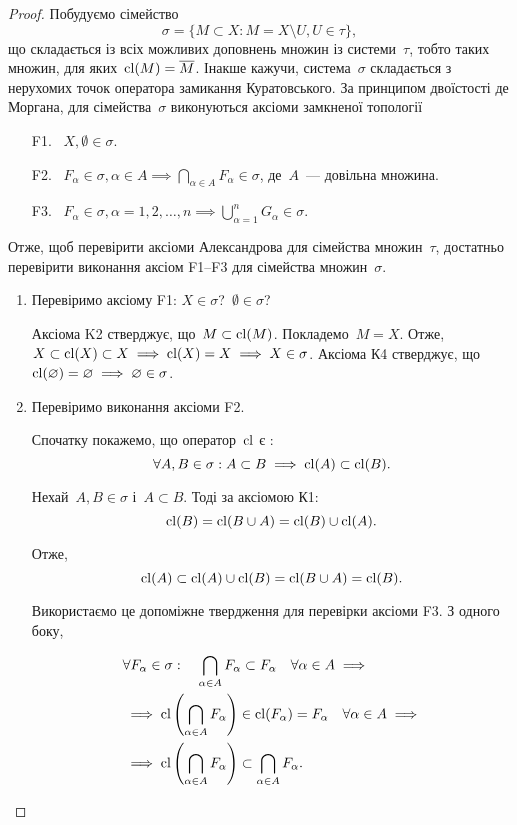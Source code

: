 \begin{proof}
Побудуємо сімейство \[\sigma = \{ M \subset X: M = X \setminus U, U \in \tau\}, \]
що складається із всіх можливих доповнень множин із
системи~$\tau$, тобто таких множин, для яких~$\operatorname{cl}(M) = \overline{M}$. Інакше
кажучи, система~$\sigma$ складається з нерухомих точок оператора
замикання Куратовського. За принципом двоїстості де
Моргана, для сімейства~$\sigma$ виконуються аксіоми замкненої
топології

\begin{enumerate}
\item[F1.]~$X, \emptyset \in \sigma$.
\item[F2.]~$F_\alpha \in \sigma, \alpha \in A \implies \bigcap_{\alpha \in A} F_\alpha \in \sigma$, де~$A$~--- довільна множина.
\item[F3.]~$F_\alpha \in \sigma, \alpha = 1, 2, \ldots, n \implies \bigcup_{\alpha = 1}^n G_\alpha \in \sigma$.
\end{enumerate}

Отже, щоб перевірити аксіоми Александрова для
сімейства множин~$\tau$, достатньо перевірити виконання аксіом
F1--F3 для сімейства множин~$\sigma$.

\begin{enumerate}
\item Перевіримо аксіому F1: $X \in \sigma$?~$\emptyset \in \sigma$?

Аксіома K2 стверджує, що~$M \subset \operatorname{cl}(M)$. Покладемо~$M = X$.
Отже,~$X \subset \operatorname{cl}(X) \subset X \implies \operatorname{cl}(X) = X \implies X \in \sigma$.
Аксіома К4 стверджує, що~$\operatorname{cl}(\varnothing) = \varnothing \implies \varnothing \in \sigma$.

\item Перевіримо виконання аксіоми F2.

Спочатку покажемо, що оператор~$\operatorname{cl}$ є :
\[\forall A, B \in \sigma: A \subset B \implies \operatorname{cl}(A) \subset \operatorname{cl}(B).\]

Нехай~$A, B \in \sigma$ і~$A \subset B$. Тоді за аксіомою К1:
\[ \operatorname{cl}(B) = \operatorname{cl}(B \cup A) = \operatorname{cl}(B) \cup \operatorname{cl}(A).\]

Отже, \[ \operatorname{cl}(A) \subset \operatorname{cl}(A) \cup \operatorname{cl}(B) = \operatorname{cl}(B \cup A) = \operatorname{cl}(B). \]

Використаємо це допоміжне твердження для перевірки
аксіоми F3. З одного боку,

\begin{align*}
& \forall F_\alpha \in \sigma: \quad \bigcap_{\alpha \in A} F_\alpha \subset F_\alpha \quad \forall \alpha \in A \implies \\
& \implies \operatorname{cl} \left(\bigcap_{\alpha \in A} F_\alpha \right) \in \operatorname{cl} (F_\alpha) = F_\alpha \quad \forall \alpha \in A \implies \\
& \implies \operatorname{cl} \left(\bigcap_{\alpha \in A} F_\alpha \right) \subset \bigcap_{\alpha \in A} F_\alpha.
\end{align*}


\end{enumerate}
\end{proof}

